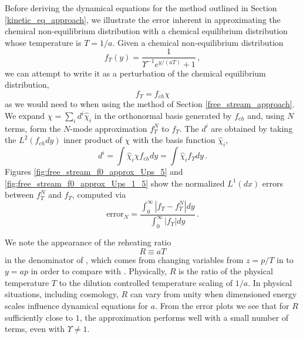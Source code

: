 Before deriving the dynamical equations for the method outlined in Section \ref{kinetic_eq_approach}, we illustrate the error inherent in approximating the chemical non-equilibrium distribution   with a  chemical equilibrium distribution  whose temperature is $T=1/a$.   Given a chemical non-equilibrium distribution 
\begin{equation}\label{zeroth_approx}
f_\Upsilon (y)=\frac{1}{\Upsilon^{-1}e^{y/(aT)}+1}\,,
\end{equation}
 we can attempt to write it as a perturbation of the chemical equilibrium distribution,  
\begin{equation}\label{chi_def}
f_\Upsilon=f_{ch}\chi
\end{equation} as we would need to when using the method of Section \ref{free_stream_approach}.  We expand $\chi=\sum_i d^i\hat\chi_i$ in the orthonormal basis generated by $f_{ch}$ and, using $N$ terms, form the $N$-mode approximation $f_\Upsilon^N$ to $f_\Upsilon$.  The $d^i$ are obtained by taking the $L^2(f_{ch}dy)$ inner product of $\chi$ with the basis function $\hat\chi_i$,
\begin{equation}
d^i=\int\hat\chi_i \chi f_{ch}dy=\int\hat\chi_i  f_\Upsilon dy\,.
\end{equation}
 Figures \ref{fig:free_stream_f0_approx_Ups_5} and \ref{fig:free_stream_f0_approx_Ups_1_5} show the normalized $L^1(dx)$ errors between $f_\Upsilon^N$ and $f_\Upsilon$, computed via
\begin{equation}
\text{error}_N=\frac{\int_0^\infty |f_\Upsilon -f_\Upsilon ^N|dy}{\int_0^\infty |f_\Upsilon |dy}\,.
\end{equation}

We note the appearance of the reheating ratio
\begin{equation}\label{reheat}
 R\equiv aT  
\end{equation}
in the denominator of , which comes from changing variables from $z=p/T$ in  to $y=ap$ in order to compare with .  Physically, $R$ is the ratio of the physical temperature $T$ to the dilution controlled temperature scaling  of $1/a$.   In physical situations, including cosmology, $R$ can vary from unity when dimensioned energy scales influence dynamical equations for $a$. From the error plots we see that for $R$ sufficiently close to $1$, the approximation performs well with a small number of terms, even with $\Upsilon\neq 1$.  

